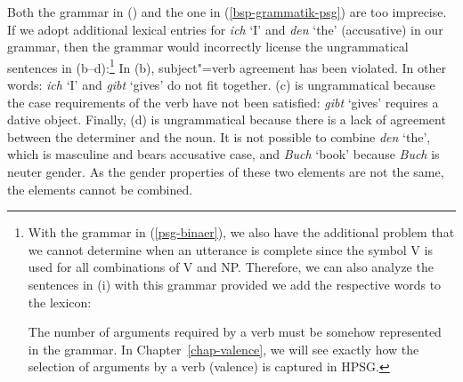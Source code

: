 Both the grammar in () and the one in (\ref{bsp-grammatik-psg}) are too imprecise.
If we adopt additional lexical entries for \emph{ich} `I' and \emph{den} `the' (accusative) in our
grammar, then the grammar would incorrectly
license the ungrammatical sentences in (b--d):\footnote{\label{fn-ex-das-kind-erwartet}%
	With the grammar in (\ref{psg-binaer}), we also have the additional problem that we cannot determine when an utterance is complete
	since the symbol V is used for all combinations of V and NP. Therefore, we can also analyze
        the sentences in (i) with this grammar provided we add the respective words to the lexicon:
  
\eal
{}
\zl
The number of arguments required by a verb must be somehow represented in the grammar. In Chapter~\ref{chap-valence}, we will see exactly
how the selection of arguments by a verb (valence) is captured in HPSG.
}
\eal
{}
\zl
In (b), subject"=verb agreement has been violated. In other words: \emph{ich} `I' and \emph{gibt} `gives' do not fit together.
(c) is ungrammatical because the case requirements of the verb have not been satisfied: \emph{gibt} `gives' requires a dative object. Finally, (d) is ungrammatical
because there is a lack of agreement between the determiner and the noun. It is not possible to combine \emph{den} `the', which is masculine and bears accusative case, 
and \emph{Buch} `book' because \emph{Buch} is neuter gender. As the gender properties
of these two elements are not the same, the elements cannot be combined.


